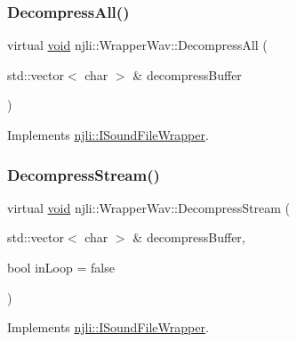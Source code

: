 \subsubsection{\texorpdfstring{Decompress\+All()}{DecompressAll()}}
{\footnotesize\ttfamily virtual \mbox{\hyperlink{_thread_8h_af1e856da2e658414cb2456cb6f7ebc66}{void}} njli\+::\+Wrapper\+Wav\+::\+Decompress\+All (\begin{DoxyParamCaption}\item[{std\+::vector$<$ char $>$ \&}]{decompress\+Buffer }\end{DoxyParamCaption})\hspace{0.3cm}{\ttfamily [virtual]}}



Implements \mbox{\hyperlink{classnjli_1_1_i_sound_file_wrapper_a9b338a5bbcb5d07acdebce1efab332c5}{njli\+::\+I\+Sound\+File\+Wrapper}}.

\mbox{\label{classnjli_1_1_wrapper_wav_aa84e533c55261000594f1889f60d1ef5}} 
\subsubsection{\texorpdfstring{Decompress\+Stream()}{DecompressStream()}}
{\footnotesize\ttfamily virtual \mbox{\hyperlink{_thread_8h_af1e856da2e658414cb2456cb6f7ebc66}{void}} njli\+::\+Wrapper\+Wav\+::\+Decompress\+Stream (\begin{DoxyParamCaption}\item[{std\+::vector$<$ char $>$ \&}]{decompress\+Buffer,  }\item[{bool}]{in\+Loop = {\ttfamily false} }\end{DoxyParamCaption})\hspace{0.3cm}{\ttfamily [virtual]}}



Implements \mbox{\hyperlink{classnjli_1_1_i_sound_file_wrapper_a2e62b8b05da06eb1f9594ffdd5aa0cfd}{njli\+::\+I\+Sound\+File\+Wrapper}}.

\mbox{\label{classnjli_1_1_wrapper_wav_ac7f741a2d2db3126eec69b64eb2cacfc}} 
